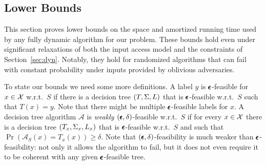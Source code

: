 \subsection{Lower Bounds}
\label{sec:lb}
This section proves lower bounds on the space and amortized running time used by any fully dynamic algorithm for our problem. These bounds hold even under significant relaxations of both the input access model and the constraints of Section~\ref{sec:dyn}. Notably, they hold for randomized algorithms that can fail with constant probability under inputs provided by oblivious adversaries.

To state our bounds we need some more definitions. A label $y$ is $\pmb{\epsilon}$-feasible for $x \in \mathcal{X}$ w.r.t.\ $S$ if there is a decision tree $(T,\Sigma,L)$ that is $\pmb{\epsilon}$-feasible w.r.t.\ $S$ such that $T(x)=y$. Note that there might be multiple $\pmb{\epsilon}$-feasible labels for $x$.  A decision tree algorithm $\mathcal{A}$ is \emph{weakly $(\pmb{\epsilon},\delta)$}-feasible w.r.t.\ $S$ if for every $x \in \mathcal{X}$ there is a decision tree $(T_x,\Sigma_x,L_x)$ that is $\pmb{\epsilon}$-feasible w.r.t.\ $S$ and such that $\Pr(\mathcal{A}_S(x)=T_x(x)) \ge \delta$. Note that $(\pmb{\epsilon},\delta)$-feasibility is much weaker than $\pmb{\epsilon}$-feasibility: not only it allows the algorithm to fail, but it does not even require it to be coherent with any given $\pmb{\epsilon}$-feasible tree.


